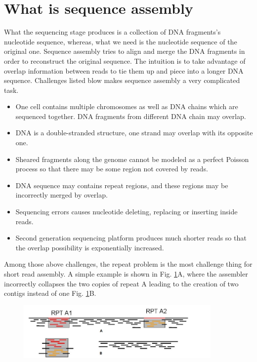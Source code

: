 \documentclass{article}
\begin{document}
\section{What is sequence assembly}
What the sequencing stage produces is a collection of DNA fragments's nucleotide sequence, whereas, what we need is the nucleotide sequence of the original one. Sequence assembly tries to align and merge the DNA fragments in order to reconstruct the original sequence. The intuition is to take advantage of overlap information between reads to tie them up and piece into a longer DNA sequence. Challenges listed blow makes sequence assembly a very complicated task.\\
\begin{itemize}
 \item One cell contains multiple chromosomes as well as DNA chains which are sequenced together. DNA fragments from different DNA chain may overlap.
 \item DNA is a double-stranded structure, one strand may overlap with its opposite one.
 \item Sheared fragments along the genome cannot be modeled as a perfect Poisson process so that there may be some region not covered by reads.
 \item DNA sequence may contains repeat regions, and these regions may be incorrectly merged by overlap.
 \item Sequencing errors causes nucleotide deleting, replacing or inserting inside reads.
 \item Second generation sequencing platform produces much shorter reads so that the overlap possibility is exponentially increased.
\end{itemize}
Among those above challenges, the repeat problem is the most challenge thing for short read assembly. A simple example is shown in Fig. \ref{repeat_example}A, where the assembler incorrectly collapses the two copies of repeat A leading to the creation of two contigs instead of one Fig. \ref{repeat_example}B.\\
\begin{figure}[ht]
  \centering
  \includegraphics[width=10cm]{Figure4.jpg}\\
  \caption{}\label{repeat_example}
\end{figure}
\end{document}
